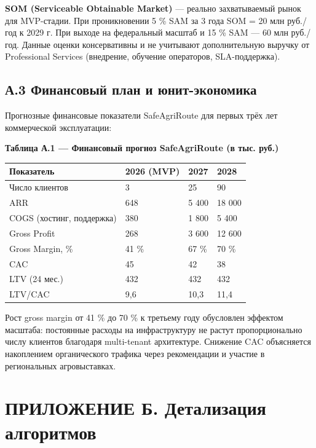 \documentclass[14pt,a4paper]{extarticle}
\begin{document}
\textbf{SOM (Serviceable Obtainable Market)} --- реально захватываемый рынок для MVP-стадии. При проникновении 5 \% SAM за 3 года SOM = 20 млн руб./год к 2029 г. При выходе на федеральный масштаб и 15 \% SAM --- 60 млн руб./год. Данные оценки консервативны и не учитывают дополнительную выручку от Professional Services (внедрение, обучение операторов, SLA-поддержка).

\hypertarget{ux430.3-ux444ux438ux43dux430ux43dux441ux43eux432ux44bux439-ux43fux43bux430ux43d-ux438-ux44eux43dux438ux442-ux44dux43aux43eux43dux43eux43cux438ux43aux430}{%
\subsection{А.3 Финансовый план и юнит-экономика}\label{ux430.3-ux444ux438ux43dux430ux43dux441ux43eux432ux44bux439-ux43fux43bux430ux43d-ux438-ux44eux43dux438ux442-ux44dux43aux43eux43dux43eux43cux438ux43aux430}}

Прогнозные финансовые показатели SafeAgriRoute для первых трёх лет коммерческой эксплуатации:

\textbf{Таблица А.1 --- Финансовый прогноз SafeAgriRoute (в тыс. руб.)}

\begin{longtable}[]{@{}llll@{}}
\toprule\noalign{}
Показатель & 2026 (MVP) & 2027 & 2028 \\
\midrule\noalign{}
\endhead
\bottomrule\noalign{}
\endlastfoot
Число клиентов & 3 & 25 & 90 \\
ARR & 648 & 5 400 & 18 000 \\
COGS (хостинг, поддержка) & 380 & 1 800 & 5 400 \\
Gross Profit & 268 & 3 600 & 12 600 \\
Gross Margin, \% & 41 \% & 67 \% & 70 \% \\
CAC & 45 & 42 & 38 \\
LTV (24 мес.) & 432 & 432 & 432 \\
LTV/CAC & 9,6 & 10,3 & 11,4 \\
\end{longtable}

Рост gross margin от 41 \% до 70 \% к третьему году обусловлен эффектом масштаба: постоянные расходы на инфраструктуру не растут пропорционально числу клиентов благодаря multi-tenant архитектуре. Снижение CAC объясняется накоплением органического трафика через рекомендации и участие в региональных агровыставках.


\hypertarget{ux43fux440ux438ux43bux43eux436ux435ux43dux438ux435-ux431.-ux434ux435ux442ux430ux43bux438ux437ux430ux446ux438ux44f-ux430ux43bux433ux43eux440ux438ux442ux43cux43eux432}{%
\section{ПРИЛОЖЕНИЕ Б. Детализация алгоритмов}\label{ux43fux440ux438ux43bux43eux436ux435ux43dux438ux435-ux431.-ux434ux435ux442ux430ux43bux438ux437ux430ux446ux438ux44f-ux430ux43bux433ux43eux440ux438ux442ux43cux43eux432}}
\end{document}
